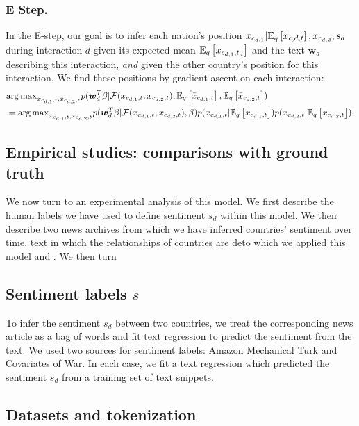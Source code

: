 \subsubsection{E Step.} In the E-step, our goal is to infer each
nation's position $x_{c_{d,1}} | \mathbb{E}_q\left[ \bar{x}_{c,d,t} \right],
x_{c_{d,2}}, s_d$ during interaction $d$ given its expected mean $\mathbb{E}_q\left[ \bar
x_{c_{d,1},t_d} \right]$ and the text $\bm w_d$ describing this interaction,
\emph{and} given the other country's position for this interaction.
We find these positions by gradient ascent on each interaction:
\begin{align}
  & {\arg \max}_{x_{c_{d,1},t}, x_{c_{d,2},t}}
  p(\bm w_d^T \beta | \mathcal{F}(x_{c_{d,1},t}, x_{c_{d,2},t}),
  \mathbb{E}_q\left[ \bar x_{c_{d,1},t} \right], \mathbb{E}_q\left[ \bar x_{c_{d,2},t} \right]) \nonumber \\
  & = 
  {\arg \max}_{x_{c_{d,1},t}, x_{c_{d,2},t}}
  p(\bm w_d^T \beta | \mathcal{F}(x_{c_{d,1},t}, x_{c_{d,2},t}), \beta)
  p(x_{c_{d,1},t} | \mathbb{E}_q\left[ \bar x_{c_{d,1},t} \right] )
  p(x_{c_{d,2},t} | \mathbb{E}_q\left[ \bar x_{c_{d,2},t} \right] ).
\end{align}

\subsection{Empirical studies: comparisons with ground truth}
We now turn to an experimental analysis of this model.  We first
describe the human labels we have used to define sentiment $s_d$
within this model.  We then describe two news archives from which we
have inferred countries' sentiment over time. text in which the
relationships of countries are deto which we applied this model and .
We then turn

\subsection{Sentiment labels $s$}
\label{section:sentiment_models}

To infer the sentiment $s_d$ between two countries, we treat the
corresponding news article as a bag of words and fit text regression
\cite{kogan:2009} to predict the sentiment from the text.  We used two
sources for sentiment labels: Amazon Mechanical Turk and Covariates of
War.  In each case, we fit a text regression which predicted the
sentiment $s_d$ from a training set of text snippets.

\subsection{Datasets and tokenization}


